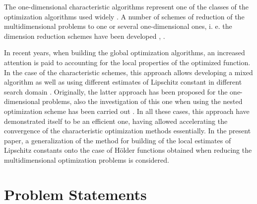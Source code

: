 \documentclass[procedia]{easychair}
\begin{document}
The one-dimensional characteristic algorithms represent one of the classes of the
optimization algorithms used widely \cite{}. A number of schemes of reduction of the
multidimensional problems to one or several one-dimensional ones, i. e. the dimension
reduction schemes have been developed \cite{stronginBook}, \cite{butzCurves}.
\par
In recent years, when building the global optimization algorithms, an increased attention
is paid to accounting for the local properties of the optimized function. In the
case of the characteristic schemes, this approach allows developing a mixed algorithm
\cite{mixedAlg} as well as using different estimates of Lipschitz constant in different search
domain \cite{sergLocalTuningFirst}. Originally, the latter approach has been proposed for the one-dimensional
problems, also the investigation of this one when using the nested optimization scheme
has been carried out \cite{nestedLocal}. In all these cases, this approach have demonstrated itself to
be an efficient one, having allowed accelerating the convergence of the characteristic
optimization methods essentially. In the present paper, a generalization of the method
for building of the local estimates of Lipschitz constants onto the case of Hölder
functions obtained when reducing the multidimensional optimization problems is considered.

\section{Problem Statements}
\label{sect:problem}
\end{document}
